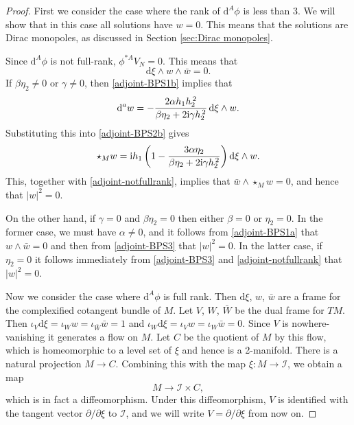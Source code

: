 \documentclass[10pt,a4paper]{amsart}
\newcommand{\II}{{\mathcal{I}}}
\newcommand{\1}{{\mathbb{1}}}
\newcommand{\lto}{\longrightarrow}
\def \d{\mathrm{d}}
\numberwithin{equation}{section}
\begin{document}
\begin{proof}
First we consider the case where the rank of $\d^A\phi$ is less than 3. We will show that in this case all solutions have $w=0$. This means that the solutions are Dirac monopoles, as discussed in Section \ref{sec:Dirac monopoles}.

Since $\d^A\phi$ is not full-rank, $\phi^{\ast A}V_N=0$. This means that \begin{equation}\label{adjoint-notfullrank}
\d\xi\wedge w\wedge\bar{w}=0.
\end{equation}
If $\beta\eta_2\neq0$ or $\gamma\neq0$, then \eqref{adjoint-BPS1b} implies that
\begin{equation}\label{adjoint-dw-solution}
\d^a w = -\frac{2\alpha h_1h_2^{\,2}}{\beta \eta_2 + 2{\rm i}\gamma h_2^{\,2}}\,\d\xi\wedge w.
\end{equation}
Substituting this into \eqref{adjoint-BPS2b} gives
\begin{equation*}
\star_{M}w = {\rm i}h_1\left(1-\frac{3\alpha \eta_2}{\beta \eta_2 + 2{\rm i}\gamma h_2^{\,2}}\right)\d\xi\wedge w.
\end{equation*}
This, together with \eqref{adjoint-notfullrank}, implies that $\bar{w}\wedge\star_{M}w=0$, and hence that $|w|^2=0$.

On the other hand, if $\gamma=0$ and $\beta\eta_2=0$ then either $\beta=0$ or $\eta_2=0$. In the former case, we must have $\alpha\neq0$, and it follows from \eqref{adjoint-BPS1a} that $w\wedge\bar{w}=0$ and then from \eqref{adjoint-BPS3} that $|w|^2=0$. In the latter case, if $\eta_2=0$ it follows immediately from \eqref{adjoint-BPS3} and \eqref{adjoint-notfullrank} that $|w|^2=0$.

Now we consider the case where $\d^A\phi$ is full rank. Then $\d\xi$, $w$, $\bar{w}$ are a frame for the complexified cotangent bundle of $M$. Let $V$, $W$, $\bar{W}$ be the dual frame for $TM$. Then $\iota_V\d\xi=\iota_W w=\iota_{\bar{W}}\bar{w}=1$ and $\iota_W\d\xi=\iota_Vw=\iota_W\bar{w}=0$. Since $V$ is nowhere-vanishing it generates a flow on $M$. Let $C$ be the quotient of $M$ by this flow, which is homeomorphic to a level set of $\xi$ and hence is a 2-manifold. There is a natural projection $M\to C$. Combining this with the map $\xi\colon M\to\II$, we obtain a map
\begin{equation*}
M\lto \II\times C,
\end{equation*}
which is in fact a diffeomorphism. Under this diffeomorphism, $V$ is identified with the tangent vector $\partial/\partial\xi$ to $\II$, and we will write $V=\partial/\partial\xi$ from now on.


\end{proof}
\end{document}
